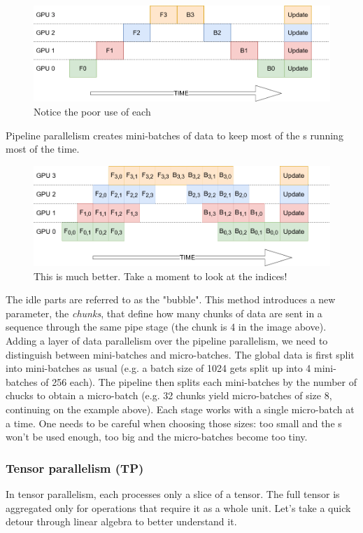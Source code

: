 \documentclass{article}
\begin{document}
\begin{figure}[h!]
  \center
  \includegraphics[width=0.7\linewidth]{images/2022-08-25-09-22-17.png}
  \caption{Notice the poor use of each }
\end{figure}
\FloatBarrier

Pipeline parallelism creates mini-batches of data to keep most of the s running most of the time.

\begin{figure}[h!]
  \center
  \includegraphics[width=0.7\linewidth]{images/2022-08-25-09-22-51.png}
  \caption{This is much better. Take a moment to look at the indices!}
\end{figure}
\FloatBarrier

The idle parts are referred to as the "bubble". This method introduces a new parameter, the \textit{chunks}, that define how many chunks of data are sent in a sequence through the same pipe stage (the chunk is 4 in the image above). Adding a layer of data parallelism over the pipeline parallelism, we need to distinguish between mini-batches and micro-batches. The global data is first split into mini-batches as usual (e.g. a batch size of 1024 gets split up into 4 mini-batches of 256 each). The pipeline then splits each mini-batches by the number of chucks to obtain a micro-batch (e.g. 32 chunks yield micro-batches of size 8, continuing on the example above). Each stage works with a single micro-batch at a time. One needs to be careful when choosing those sizes: too small and the s won't be used enough, too big and the micro-batches become too tiny.

\subsubsection{Tensor parallelism (TP)}
In tensor parallelism, each  processes only a slice of a tensor. The full tensor is aggregated only for operations that require it as a whole unit. Let's take a quick detour through linear algebra to better understand it.
\end{document}
